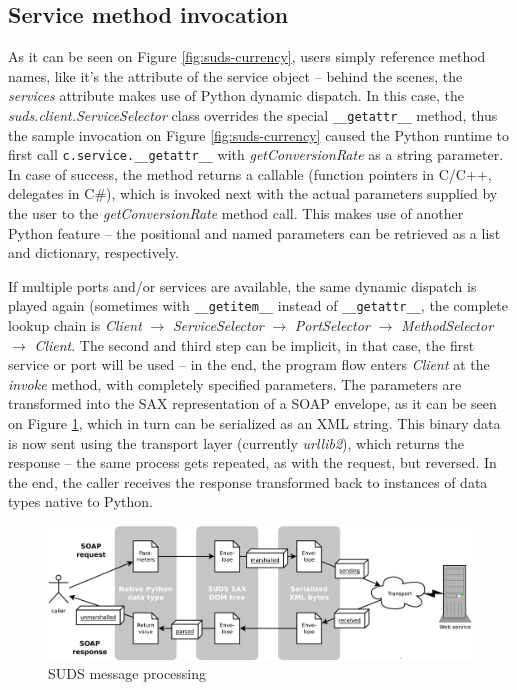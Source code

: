 \subsection{Service method invocation}
\label{sudsInvocation}

As it can be seen on Figure \ref{fig:suds-currency}, users simply reference method names, like it's the attribute of the service object -- behind the scenes, the \emph{services} attribute makes use of Python dynamic dispatch. In this case, the \emph{suds.client.ServiceSelector} class overrides the special \verb|__getattr__| method, thus the sample invocation on Figure \ref{fig:suds-currency} caused the Python runtime to first call \verb|c.service.__getattr__| with \emph{getConversionRate} as a string parameter. In case of success, the method returns a callable (function pointers in C/C++, delegates in C\#), which is invoked next with the actual parameters supplied by the user to the \emph{getConversionRate} method call. This makes use of another Python feature -- the positional and named parameters can be retrieved as a list and dictionary, respectively.

If multiple ports and/or services are available, the same dynamic dispatch is played again (sometimes with \verb|__getitem__| instead of \verb|__getattr__|, the complete lookup chain is \emph{Client} $\rightarrow$ \emph{ServiceSelector} $\rightarrow$ \emph{PortSelector} $\rightarrow$ \emph{MethodSelector} $\rightarrow$ \emph{Client}. The second and third step can be implicit, in that case, the first service or port will be used -- in the end, the program flow enters \emph{Client} at the \emph{invoke} method, with completely specified parameters. The parameters are transformed into the SAX representation of a SOAP envelope, as it can be seen on Figure \ref{fig:sudsMessage}, which in turn can be serialized as an XML string. This binary data is now sent using the transport layer (currently \emph{urllib2}), which returns the response -- the same process gets repeated, as with the request, but reversed. In the end, the caller receives the response transformed back to instances of data types native to Python.

\begin{figure}[htbp]
 \centering
 \includegraphics[width=\textwidth]{images/sudsMessage.pdf}
 \caption{SUDS message processing}
 \label{fig:sudsMessage}
\end{figure}

